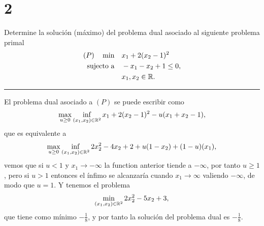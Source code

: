 \section*{2}

Determine la solución (máximo) del problema dual asociado al siguiente problema primal
\begin{equation*}
\begin{aligned}
    (P) \quad \min \quad & x_1 + 2 (x_2 - 1)^2 \\
    \text{sujecto a} \quad & - x_1 - x_2 + 1 \leq 0, \\
        & x_1, x_2 \in \mathbb{R}.
\end{aligned}
\end{equation*}

\noindent\rule{10cm}{0.4pt}

El problema dual asociado a $(P)$ se puede escribir como
\begin{equation*}
    \max_{u \geq 0} \inf_{(x_1, x_2) \in \mathbb{R}^2} x_1 + 2 (x_2 - 1)^2 - u (x_1 + x_2 - 1),
\end{equation*}
que es equivalente a
\begin{equation*}
    \max_{u \geq 0} \inf_{(x_1, x_2) \in \mathbb{R}^2}
        2 x_2^2
        - 4 x_2 
        + 2
        + u (1 - x_2)
        + (1 - u) (x_1),
\end{equation*}
vemos que si  $u < 1$ y $x_1 \rightarrow - \infty$ la function anterior tiende a $-\infty$,
por tanto $u \geq 1$,
pero si $u > 1$ entonces el ínfimo se alcanzaría cuando $x_1 \rightarrow \infty$ valiendo $-\infty$,
de modo que $u = 1$.
Y tenemos el problema
\begin{equation*}
    \min_{(x_1, x_2) \in \mathbb{R}^2}
        2 x_2^2
        - 5 x_2 
        + 3,
\end{equation*}
que tiene como mínimo $-\frac{1}{8}$,
y por tanto la solución del problema dual es $-\frac{1}{8}$.
